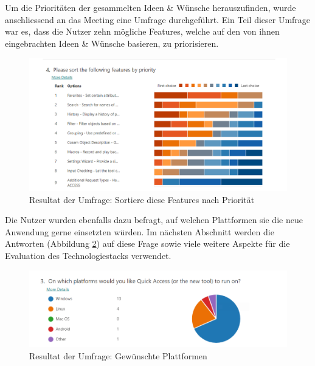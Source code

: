 Um die Prioritäten der gesammelten Ideen \& Wünsche herauszufinden, wurde anschliessend an das Meeting eine Umfrage durchgeführt.
Ein Teil dieser Umfrage war es, dass die Nutzer zehn mögliche Features, welche auf den von ihnen eingebrachten Ideen \& Wünsche basieren, zu priorisieren.


\begin{figure}[H]
   \centering
   \includegraphics[width=1.0\textwidth]{gfx/S1_Survey_Prio.png}
   \caption{
       Resultat der Umfrage: Sortiere diese Features nach Priorität
   }
   \label{fig:FeaturesPrio}
\end{figure}

Die Nutzer wurden ebenfalls dazu befragt, auf welchen Plattformen sie die neue Anwendung gerne einsetzten würden.
Im nächsten Abschnitt werden die Antworten (Abbildung \ref{fig:SurveryPlatforms}) auf diese Frage sowie viele weitere Aspekte für die Evaluation des Technologiestacks verwendet.

\begin{figure}[H]
   \centering
   \includegraphics[width=1.0\textwidth]{gfx/S0_Survey_Platform.png}
   \caption{
       Resultat der Umfrage: Gewünschte Plattformen
   }
   \label{fig:SurveryPlatforms}
\end{figure}

